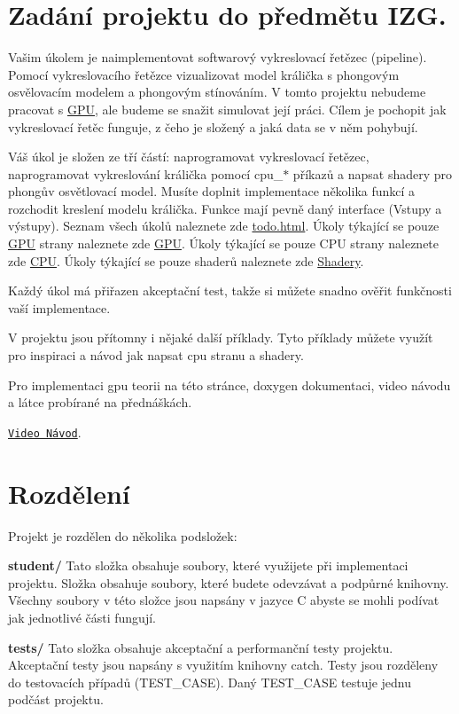 \hypertarget{index_zadani}{}\section{Zadání projektu do předmětu I\+Z\+G.}\label{index_zadani}
 Vašim úkolem je naimplementovat softwarový vykreslovací řetězec (pipeline). Pomocí vykreslovacího řetězce vizualizovat model králička s phongovým osvělovacím modelem a phongovým stínováním. V tomto projektu nebudeme pracovat s \hyperlink{structGPU}{G\+PU}, ale budeme se snažit simulovat její práci. Cílem je pochopit jak vykreslovací řetěc funguje, z čeho je složený a jaká data se v něm pohybují.

Váš úkol je složen ze tří částí\+: naprogramovat vykreslovací řetězec, naprogramovat vykreslování králička pomocí cpu\+\_\+$\ast$ příkazů a napsat shadery pro phongův osvětlovací model. Musíte doplnit implementace několika funkcí a rozchodit kreslení modelu králička. Funkce mají pevně daný interface (Vstupy a výstupy). Seznam všech úkolů naleznete zde \hyperlink{todo}{todo.\+html}. Úkoly týkající se pouze \hyperlink{structGPU}{G\+PU} strany naleznete zde \hyperlink{group__gpu__side}{G\+PU}. Úkoly týkající se pouze C\+PU strany naleznete zde \hyperlink{group__cpu__side}{C\+PU}. Úkoly týkající se pouze shaderů naleznete zde \hyperlink{group__shader__side}{Shadery}.

Každý úkol má přiřazen akceptační test, takže si můžete snadno ověřit funkčnosti vaší implementace.

V projektu jsou přítomny i nějaké další příklady. Tyto příklady můžete využít pro inspiraci a návod jak napsat cpu stranu a shadery.

Pro implementaci gpu teorii na této stránce, doxygen dokumentaci, video návodu a látce probírané na přednáškách.

\href{https://www.youtube.com/watch?v=Y2jPx8d20fE}{\tt Video Návod}.\hypertarget{index_rozdeleni}{}\section{Rozdělení}\label{index_rozdeleni}
Projekt je rozdělen do několika podsložek\+:

{\bfseries student/} Tato složka obsahuje soubory, které využijete při implementaci projektu. Složka obsahuje soubory, které budete odevzávat a podpůrné knihovny. Všechny soubory v této složce jsou napsány v jazyce C abyste se mohli podívat jak jednotlivé části fungují.

{\bfseries tests/} Tato složka obsahuje akceptační a performanční testy projektu. Akceptační testy jsou napsány s využitím knihovny catch. Testy jsou rozděleny do testovacích případů (T\+E\+S\+T\+\_\+\+C\+A\+SE). Daný T\+E\+S\+T\+\_\+\+C\+A\+SE testuje jednu podčást projektu.


